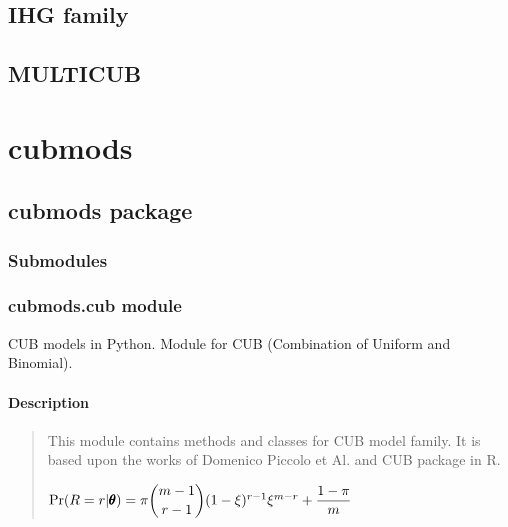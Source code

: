 \documentclass[letterpaper,10pt,english]{sphinxmanual}
\begin{document}
\section{IHG family}
\label{\detokenize{manual:ihg-family}}

\section{MULTICUB}
\label{\detokenize{manual:multicub}}
\sphinxstepscope


\chapter{cubmods}
\label{\detokenize{modules:cubmods}}\label{\detokenize{modules::doc}}
\sphinxstepscope


\section{cubmods package}
\label{\detokenize{cubmods:cubmods-package}}\label{\detokenize{cubmods::doc}}

\subsection{Submodules}
\label{\detokenize{cubmods:submodules}}

\subsection{cubmods.cub module}
\label{\detokenize{cubmods:module-cubmods.cub}}\label{\detokenize{cubmods:cubmods-cub-module}}
\sphinxAtStartPar
CUB models in Python.
Module for CUB (Combination of Uniform
and Binomial).


\subsubsection{Description}
\label{\detokenize{cubmods:description}}\begin{quote}

\sphinxAtStartPar
This module contains methods and classes
for CUB model family.
It is based upon the works of Domenico
Piccolo et Al. and CUB package in R.

\sphinxAtStartPar
\(\Pr(R=r|\pmb{\theta}) = \pi \dbinom{m-1}{r-1}(1-\xi)^{r-1}\xi^{m-r}+\dfrac{1-\pi}{m}\)
\end{quote}
\end{document}
